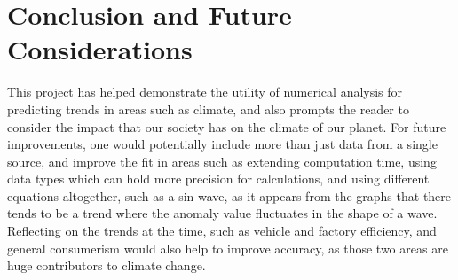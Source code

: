 \documentclass[11pt]{article}
\begin{document}
\section{Conclusion and Future Considerations}
This project has helped demonstrate the utility of numerical analysis for predicting trends in areas such as climate, and also prompts the reader to consider the impact that our society has on the climate of our planet. For future improvements, one would potentially include more than just data from a single source, and improve the fit in areas such as extending computation time, using data types which can hold more precision for calculations, and using different equations altogether, such as a sin wave, as it appears from the graphs that there tends to be a trend where the anomaly value fluctuates in the shape of a wave. Reflecting on the trends at the time, such as vehicle and factory efficiency, and general consumerism would also help to improve accuracy, as those two areas are huge contributors to climate change.
\end{document}
